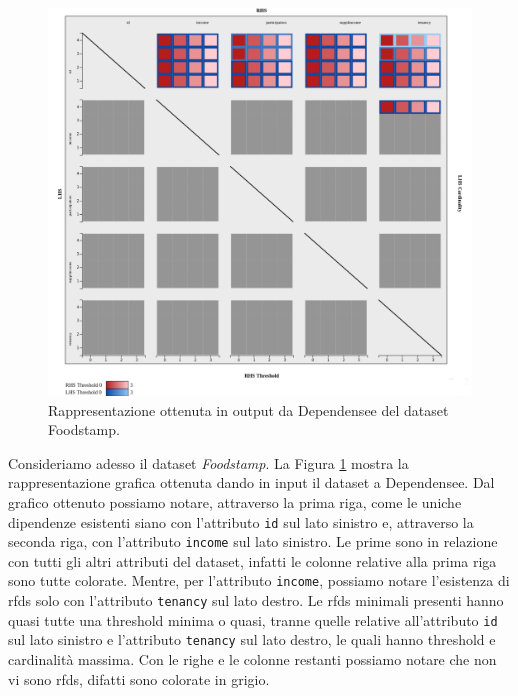 \begin{figure}[ht]
    \centering
    \includegraphics[width=\linewidth]{capitoli/figure/foodstamp_result}
    \caption{Rappresentazione ottenuta in output da Dependensee del dataset Foodstamp.}
    \label{fig:foodstamp_result}
\end{figure}
Consideriamo adesso il dataset \textit{Foodstamp}. La Figura \ref{fig:foodstamp_result} mostra la rappresentazione grafica ottenuta dando in input il dataset a Dependensee. Dal grafico ottenuto possiamo notare, attraverso la prima riga, come le uniche dipendenze esistenti siano con l'attributo \texttt{id} sul lato sinistro e, attraverso la seconda riga, con l'attributo \texttt{income} sul lato sinistro. Le prime sono in relazione con tutti gli altri attributi del dataset, infatti le colonne relative alla prima riga sono tutte colorate. Mentre, per l'attributo \texttt{income}, possiamo notare l'esistenza di \acrlong{rfds} solo con l'attributo \texttt{tenancy} sul lato destro. Le \acrlong{rfds} minimali presenti hanno quasi tutte una threshold minima o quasi, tranne quelle relative all'attributo \texttt{id} sul lato sinistro e l'attributo \texttt{tenancy} sul lato destro, le quali hanno threshold e cardinalit\`{a} massima. Con le righe e le colonne restanti possiamo notare che non vi sono \acrlong{rfds}, difatti sono colorate in grigio.\par
